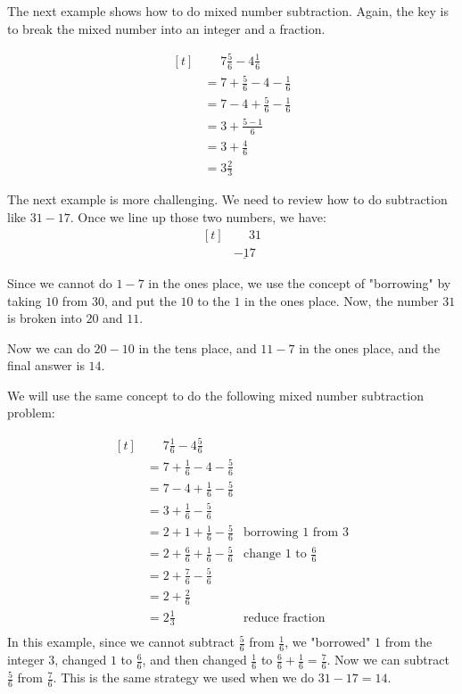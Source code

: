 The next example shows how to do mixed number subtraction. Again, the key is to break the mixed number into an integer and a fraction.

\begin{myexample}
\[ 
\begin{aligned}[t]
	&\phantom{{}=}7\frac{5}{6}-4\frac{1}{6} \\
	&= 7+\frac{5}{6}-4-\frac{1}{6} \\
	&= 7-4+\frac{5}{6}-\frac{1}{6} \\
	&= 3+\frac{5-1}{6} \\
	&= 3+\frac{4}{6} \\
	&= 3\frac{2}{3}
\end{aligned}
\]
\end{myexample}

The next example is more challenging. We need to review how to do subtraction like $31-17$. Once we line up those two numbers, we have:
\[
\begin{aligned}[t]
	&\phantom{-}31 \\
	&\underline{-17}
\end{aligned}
\]

Since we cannot do $1-7$ in the ones place, we use the concept of "borrowing" by taking $10$ from $30$, and put the $10$ to the $1$ in the ones place. Now, the number $31$ is broken into $20$ and $11$.

Now we can do $20-10$ in the tens place, and $11-7$ in the ones place, and the final answer is $14$.

We will use the same concept to do the following mixed number subtraction problem:

\begin{myexample}
\[ 
\begin{aligned}[t]
	&\phantom{{}=}7\frac{1}{6}-4\frac{5}{6} \\
	&= 7+\frac{1}{6}-4-\frac{5}{6} \\
	&= 7-4+\frac{1}{6}-\frac{5}{6} \\
	&= 3+\frac{1}{6}-\frac{5}{6} \\
	&= 2+1+\frac{1}{6}-\frac{5}{6} & \text{borrowing 1 from 3}\\
	&= 2+\frac{6}{6}+\frac{1}{6}-\frac{5}{6} &\text{change }1\text{ to } \frac{6}{6}\\
	&= 2+\frac{7}{6}-\frac{5}{6} \\
	&= 2+\frac{2}{6} \\
	&= 2\frac{1}{3} &\text{reduce fraction} \\
\end{aligned}
\]
In this example, since we cannot subtract $\frac{5}{6}$ from $\frac{1}{6}$, we "borrowed" $1$ from the integer $3$, changed $1$ to $\frac{6}{6}$, and then changed $\frac{1}{6}$ to $\frac{6}{6}+\frac{1}{6}=\frac{7}{6}$. Now we can subtract $\frac{5}{6}$ from $\frac{7}{6}$. This is the same strategy we used when we do $31-17=14$.
\end{myexample}

